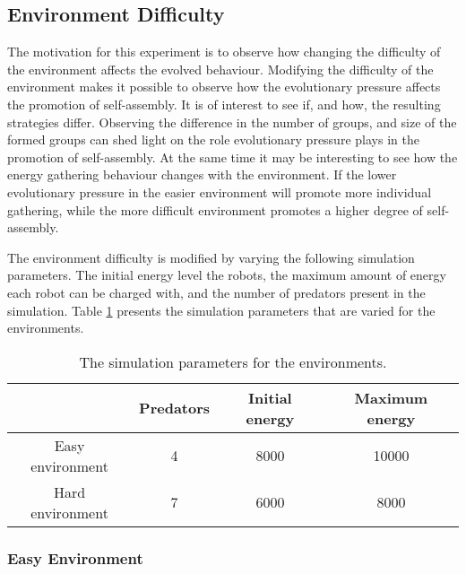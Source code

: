 \newpage

\subsection{Environment Difficulty}
The motivation for this experiment is to observe how changing the difficulty of the environment affects the evolved behaviour.
Modifying the difficulty of the environment makes it possible to observe how the evolutionary pressure affects the promotion of self-assembly.
It is of interest to see if, and how, the resulting strategies differ.
Observing the difference in the number of groups, and size of the formed groups can shed light on the role evolutionary pressure plays in the promotion of self-assembly.
At the same time it may be interesting to see how the energy gathering behaviour changes with the environment.
If the lower evolutionary pressure in the easier environment will promote more individual gathering, while the more difficult environment promotes a higher degree of self-assembly.


The environment difficulty is modified by varying the following simulation parameters.
The initial energy level the robots, the maximum amount of energy each robot can be charged with, and the number of predators present in the simulation.
Table \ref{tab-environment} presents the simulation parameters that are varied for the environments.

\begin{table}
	\centering
	\begin{tabular}{|c|c|c|c|}
		\hline  & Predators & Initial energy & Maximum energy \\ 
		\hline Easy environment & 4 & 8000 & 10000 \\ 
		\hline Hard environment & 7 & 6000 & 8000 \\ 
		\hline 
		
	\end{tabular} 
	\label{tab-environment}
	\caption{The simulation parameters for the environments.}
\end{table}


\subsubsection{Easy Environment}

\newpage

